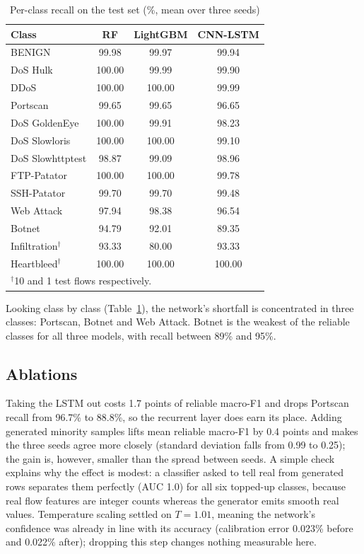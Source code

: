 \documentclass[conference]{IEEEtran}
\begin{document}
\begin{table}[t]
\caption{Per-class recall on the test set (\%, mean over three seeds)}
\label{tab:perclass}
\centering
\footnotesize
\begin{tabular}{lccc}
\toprule
Class & RF & LightGBM & CNN-LSTM \\
\midrule
BENIGN & 99.98 & 99.97 & 99.94 \\
DoS Hulk & 100.00 & 99.99 & 99.90 \\
DDoS & 100.00 & 100.00 & 99.99 \\
Portscan & 99.65 & 99.65 & 96.65 \\
DoS GoldenEye & 100.00 & 99.91 & 98.23 \\
DoS Slowloris & 100.00 & 100.00 & 99.10 \\
DoS Slowhttptest & 98.87 & 99.09 & 98.96 \\
FTP-Patator & 100.00 & 100.00 & 99.78 \\
SSH-Patator & 99.70 & 99.70 & 99.48 \\
Web Attack & 97.94 & 98.38 & 96.54 \\
Botnet & 94.79 & 92.01 & 89.35 \\
Infiltration$^\dagger$ & 93.33 & 80.00 & 93.33 \\
Heartbleed$^\dagger$ & 100.00 & 100.00 & 100.00 \\
\bottomrule
\multicolumn{4}{l}{$^\dagger$10 and 1 test flows respectively.}
\end{tabular}
\end{table}

Looking class by class (Table~\ref{tab:perclass}), the network's shortfall is concentrated in
three classes: Portscan, Botnet and Web Attack. Botnet is the weakest of the reliable classes for
all three models, with recall between 89\% and 95\%.

\subsection{Ablations}
Taking the LSTM out costs 1.7 points of reliable macro-F1 and drops Portscan recall from 96.7\% to
88.8\%, so the recurrent layer does earn its place. Adding generated minority samples lifts mean
reliable macro-F1 by 0.4 points and makes the three seeds agree more closely (standard deviation
falls from 0.99 to 0.25); the gain is, however, smaller than the spread between seeds. A simple
check explains why the effect is modest: a classifier asked to tell real from generated rows
separates them perfectly (AUC 1.0) for all six topped-up classes, because real flow features are
integer counts whereas the generator emits smooth real values. Temperature scaling settled on
$T=1.01$, meaning the network's confidence was already in line with its accuracy (calibration
error 0.023\% before and 0.022\% after); dropping this step changes nothing measurable here.
\end{document}
